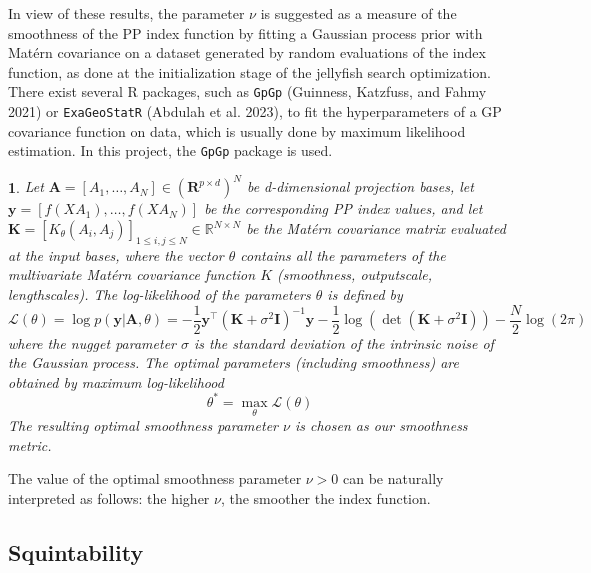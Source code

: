 \documentclass[
  12pt,
]{interact}
\theoremstyle{plain}
\newtheorem{defn}{\protect\definitionname}
\providecommand{\definitionname}{Definition}
\begin{document}
In view of these results, the parameter \(\nu\) is suggested as a
measure of the smoothness of the PP index function by fitting a Gaussian
process prior with Matérn covariance on a dataset generated by random
evaluations of the index function, as done at the initialization stage
of the jellyfish search optimization. There exist several R packages,
such as \texttt{GpGp} (Guinness, Katzfuss, and Fahmy 2021) or
\texttt{ExaGeoStatR} (Abdulah et al. 2023), to fit the hyperparameters
of a GP covariance function on data, which is usually done by maximum
likelihood estimation. In this project, the \texttt{GpGp} package is
used.

\begin{defn}
Let $\mathbf{A}=[A_1, \ldots, A_N] \in (\mathbf{R}^{p \times d})^N$ be d-dimensional projection bases, let $\mathbf{y}=[f(XA_1),\ldots,f(XA_N)]$ be the corresponding PP index values, and let $\mathbf{K}=[K_\theta(A_{i},A_{j})]_{1\leq i,j\leq N}\in\mathbb{R}^{N\times N}$ be the Matérn covariance matrix evaluated at the input bases, where the vector $\theta$ contains all the parameters of the multivariate Matérn covariance function $K$ (smoothness, outputscale, lengthscales). The log-likelihood of the parameters $\theta$ is defined by 
\begin{equation}
\mathcal{L}(\theta)=\log p(\mathbf{y}\left|\mathbf{A},\theta\right.)=-\frac{1}{2}\mathbf{y}^{\top}(\mathbf{K}+\sigma^{2}\mathbf{I})^{-1}\mathbf{y}-\frac{1}{2}\mathrm{\log}(\det(\mathbf{K}+\sigma^{2}\mathbf{I}))-\frac{N}{2}\log(2\pi)\, \label{eq:gp_log_likelihood}
\end{equation}
where the nugget parameter $\sigma$ is the standard deviation of the intrinsic noise of the Gaussian process.
The optimal parameters (including smoothness) are obtained by maximum log-likelihood
\begin{equation}
\theta^* = \underset{\theta}{\max}\mathcal{L}(\theta)
\end{equation}
The resulting optimal smoothness parameter $\nu$ is chosen as our smoothness metric.
\end{defn}

The value of the optimal smoothness parameter \(\nu>0\) can be naturally
interpreted as follows: the higher \(\nu\), the smoother the index
function.

\hypertarget{sec-squintability}{%
\subsection{Squintability}\label{sec-squintability}}
\end{document}
